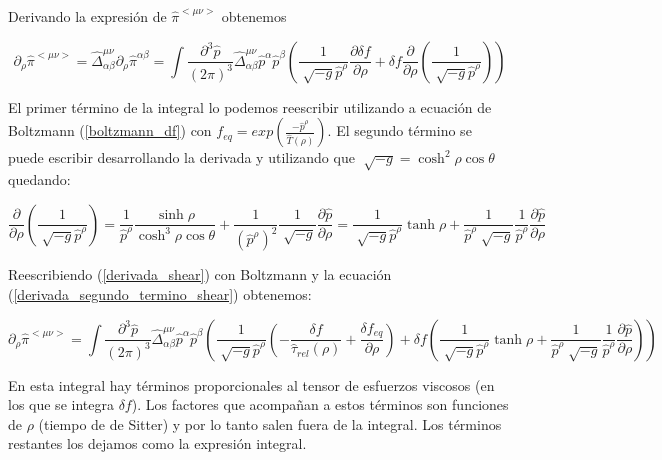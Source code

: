 \documentclass[11pt,a4paper]{article}
\begin{document}
Derivando la expresión de $\hat{\pi}^{<{\mu}{\nu}>}$ obtenemos

\begin{equation}
\partial_{\rho}\hat{\pi}^{<{\mu}{\nu}>}=
\hat{\Delta}^{{\mu}{\nu}}_{{\alpha}{\beta}}\partial_{\rho}\hat{\pi}^{{\alpha}{\beta}}=
\int{\frac{\partial^3\hat{p}}{(2\pi)^3}}\hat{\Delta}^{{\mu}{\nu}}_{{\alpha}{\beta}}\hat{p}^{\alpha}\hat{p}^{\beta}(\frac{1}{\sqrt[]{-g}\hat{p}^{\rho}}\frac{\partial\delta{f}}{\partial\rho}+\delta{f}\frac{\partial}{\partial\rho}(\frac{1}{\sqrt[]{-g}\hat{p}^{\rho}}))
\label{derivada_shear}
\end{equation}

El primer término de la integral lo podemos reescribir utilizando a ecuación de Boltzmann (\ref{boltzmann_df}) con $f_{eq}=exp({\frac{-\hat{p}^{\rho}}{\hat{T}(\rho)}})$. El segundo término se puede escribir desarrollando la derivada y utilizando que $\sqrt[]{-g}=\cosh^2\rho\cos\theta$ quedando:

\begin{equation}
\frac{\partial}{\partial\rho}(\frac{1}{\sqrt[]{-g}\hat{p}^{\rho}})=\frac{1}{\hat{p}^{\rho}}\frac{\sinh\rho}{\cosh^3\rho\cos\theta}+\frac{1}{(\hat{p}^{\rho})^2}\frac{1}{\sqrt[]{-g}}\frac{\partial\hat{p}}{\partial\rho}=
\frac{1}{\sqrt[]{-g}\hat{p}^{\rho}}\tanh\rho+\frac{1}{\hat{p}^{\rho}\sqrt[]{-g}}\frac{1}{\hat{p}^\rho}\frac{\partial\hat{p}}{\partial\rho}
\label{derivada_segundo_termino_shear}
\end{equation}


Reescribiendo (\ref{derivada_shear}) con Boltzmann y la ecuación (\ref{derivada_segundo_termino_shear}) obtenemos:


\begin{equation}
\partial_{\rho}\hat{\pi}^{<{\mu}{\nu}>}=
\int{\frac{\partial^3\hat{p}}{(2\pi)^3}}\hat{\Delta}^{{\mu}{\nu}}_{{\alpha}{\beta}}\hat{p}^{\alpha}\hat{p}^{\beta}(\frac{1}{\sqrt[]{-g}\hat{p}^{\rho}}(-\frac{\delta{f}}{\hat{\tau}_{rel}(\rho)}+\frac{\delta{f}_{eq}}{\partial\rho})
+\delta{f}(\frac{1}{\sqrt[]{-g}\hat{p}^{\rho}}\tanh\rho+\frac{1}{\hat{p}^{\rho}\sqrt[]{-g}}\frac{1}{\hat{p}^\rho}\frac{\partial\hat{p}}{\partial\rho}))
\label{derivada_shear_desarrollada}
\end{equation}

En esta integral hay términos proporcionales al tensor de esfuerzos viscosos (en los que se integra $\delta{f}$). Los factores que acompañan a estos términos son funciones de $\rho$ (tiempo de de Sitter) y por lo tanto salen fuera de la integral. Los términos restantes los dejamos como la expresión integral.
\end{document}
